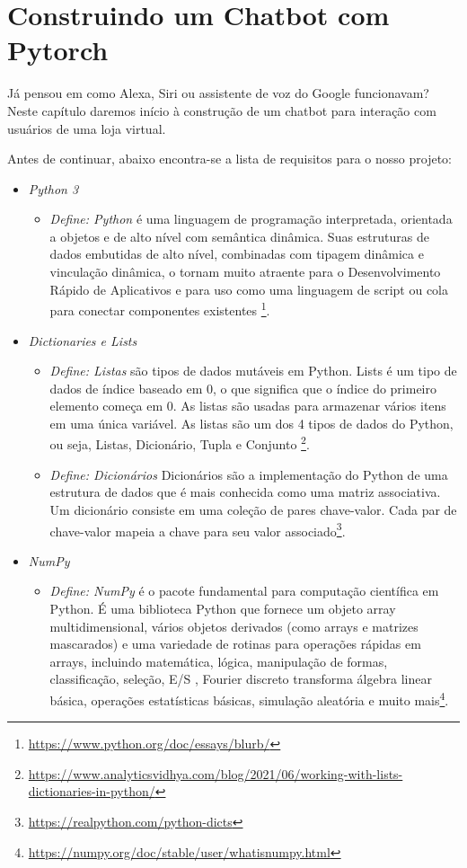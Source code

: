 \chapter[Construindo um Chatbot com Pytorch]{Construindo um Chatbot com Pytorch}

Já pensou em como Alexa, Siri ou assistente de voz do Google funcionavam? Neste capítulo daremos início à construção de um chatbot para interação com usuários de uma loja virtual.

Antes de continuar, abaixo encontra-se a lista de requisitos para o nosso projeto:
\justifying
\begin{itemize}
   \item \textit{Python 3}
         \begin{itemize}
            \item \textit{Define: Python} é uma linguagem de programação interpretada, orientada a objetos e de alto nível com semântica dinâmica. Suas estruturas de dados embutidas de alto nível, combinadas com tipagem dinâmica e vinculação dinâmica, o tornam muito atraente para o Desenvolvimento Rápido de Aplicativos e para uso como uma linguagem de script ou cola para conectar componentes existentes \footnote{\url{https://www.python.org/doc/essays/blurb/}}.
         \end{itemize}

   \item \textit{Dictionaries e Lists}
         \begin{itemize}
            \item \textit{Define: Listas} são tipos de dados mutáveis em Python. Lists é um tipo de dados de índice baseado em 0, o que significa que o índice do primeiro elemento começa em 0. As listas são usadas para armazenar vários itens em uma única variável. As listas são um dos 4 tipos de dados do Python, ou seja, Listas, Dicionário, Tupla e Conjunto \footnote{\url{https://www.analyticsvidhya.com/blog/2021/06/working-with-lists-dictionaries-in-python/}}.
            \item \textit{Define: Dicionários} Dicionários são a implementação do Python de uma estrutura de dados que é mais conhecida como uma matriz associativa. Um dicionário consiste em uma coleção de pares chave-valor. Cada par de chave-valor mapeia a chave para seu valor associado\footnote{\url{https://realpython.com/python-dicts}}.
         \end{itemize}

   \item \textit{NumPy}
         \begin{itemize}
            \item \textit{Define: NumPy} é o pacote fundamental para computação científica em Python. É uma biblioteca Python que fornece um objeto array multidimensional, vários objetos derivados (como arrays e matrizes mascarados) e uma variedade de rotinas para operações rápidas em arrays, incluindo matemática, lógica, manipulação de formas, classificação, seleção, E/S , Fourier discreto transforma álgebra linear básica, operações estatísticas básicas, simulação aleatória e muito mais\footnote{\url{https://numpy.org/doc/stable/user/whatisnumpy.html}}.
         \end{itemize}


\end{itemize}
